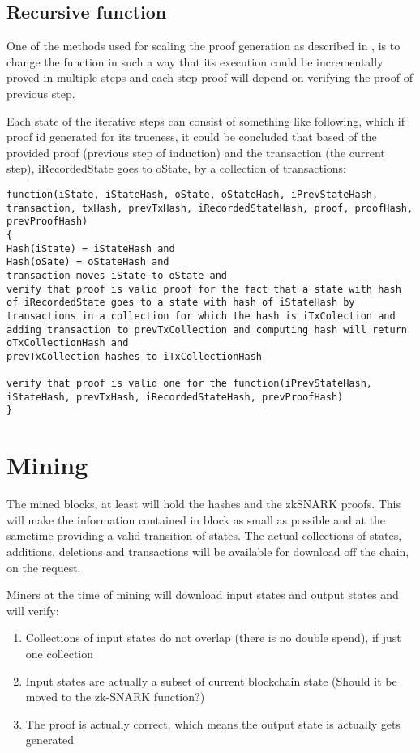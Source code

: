 \documentclass{article}
\begin{document}
\subsection{Recursive function}

One of the methods used for scaling the proof generation as described in \cite{scalableZKSNARK}, is to change the function in such a way that its execution could be incrementally proved in multiple steps and each step proof will depend on verifying the proof of previous step.

Each state of the iterative steps can consist of something like following, which if proof id generated for its trueness, it could be concluded that based of the provided proof (previous step of induction) and the transaction (the current step), iRecordedState goes to oState, by a collection of transactions:

\begin{lstlisting}
function(iState, iStateHash, oState, oStateHash, iPrevStateHash, transaction, txHash, prevTxHash, iRecordedStateHash, proof, proofHash, prevProofHash)
{
Hash(iState) = iStateHash and
Hash(oSate) = oStateHash and
transaction moves iState to oState and
verify that proof is valid proof for the fact that a state with hash of iRecordedState goes to a state with hash of iStateHash by transactions in a collection for which the hash is iTxColection and
adding transaction to prevTxCollection and computing hash will return oTxCollectionHash and
prevTxCollection hashes to iTxCollectionHash

verify that proof is valid one for the function(iPrevStateHash, iStateHash, prevTxHash, iRecordedStateHash, prevProofHash)
}

\end{lstlisting}

\section{Mining}

The mined blocks, at least will hold the hashes and the zkSNARK proofs. This will make the information contained in block as small as possible and at the sametime providing a valid transition of states. The actual collections of states, additions, deletions and transactions will be available for download off the chain, on the request.

Miners at the time of mining will download input states and output states and will verify:

\begin{enumerate}
\item Collections of input states do not overlap (there is no double spend), if just one collection 
\item Input states are actually a subset of current blockchain state (Should it be moved to the zk-SNARK function?)
\item The proof is actually correct, which means the output state is actually gets generated
\end{enumerate}
\end{document}
